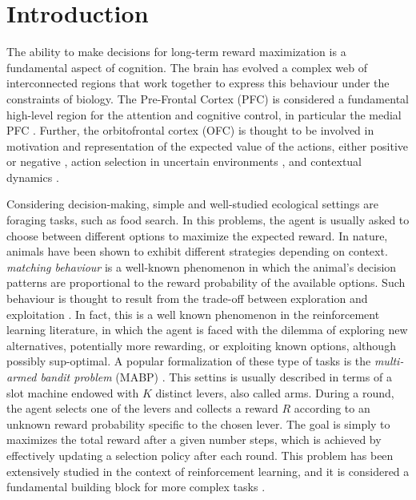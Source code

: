 
\section{Introduction}
\hfill \break
\vspace {0.5cm}

The ability to make decisions for long-term reward maximization is a fundamental aspect of cognition. The brain has evolved a complex web of interconnected regions that work together to express this behaviour under the constraints of biology. The Pre-Frontal Cortex (PFC) is considered
a fundamental high-level region for the attention and cognitive control, in particular the medial PFC \cite{millerIntegrativeTheoryPrefrontal2001a, sheynikhovichLongtermMemorySynaptic2023}.
Further, the orbitofrontal cortex (OFC) is thought to be involved in motivation and representation of the expected value of the actions, either positive or negative \cite{odohertyAbstractRewardPunishment2001, ricebergRewardStabilityDetermines2012, tremblayRelativeRewardPreference1999}, action selection in uncertain environments \cite{elliottDissociableFunctionsMedial2000}, and contextual dynamics \cite{frankAnatomyDecisionStriatoorbitofrontal2006}.

Considering decision-making, simple and well-studied ecological settings are foraging tasks, such as food search. In this problems, the agent is usually asked to choose between different options to maximize the expected reward.
In nature, animals have been shown to exhibit different strategies depending on context.
\textit{matching behaviour} is a well-known phenomenon in which the animal's decision patterns are proportional to the reward probability of the available options.
Such behaviour is thought to result from the trade-off between exploration and exploitation \cite{suttonReinforcementLearningProblem1998, nivEvolutionReinforcementLearning2002}.
In fact, this is a well known phenomenon in the reinforcement learning literature, in which the agent is faced with the dilemma of exploring new alternatives, potentially more rewarding, or exploiting known options, although possibly sup-optimal.
A popular formalization of these type of tasks is the \textit{multi-armed bandit problem} (MABP) \cite{averbeckTheoryChoiceBandit2015}. This settins is usually described in terms of a slot machine endowed with $K$ distinct levers, also called arms.
During a round, the agent selects one of the levers and collects a reward $R$ according to an unknown reward probability specific to the chosen lever.
The goal is simply to maximizes the total reward after a given number steps, which is achieved by effectively updating a selection policy after each round.
This problem has been extensively studied in the context of reinforcement learning, and it is considered a fundamental building block for more complex tasks \cite{suttonReinforcementLearningProblem1998}.

